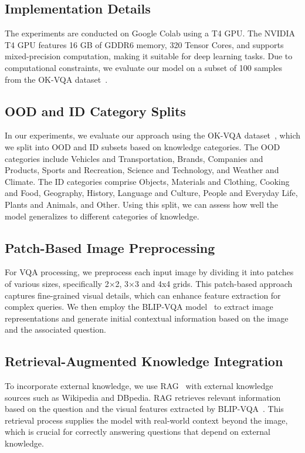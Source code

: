 \subsection{Implementation Details}
The experiments are conducted on Google Colab using a T4 GPU. The NVIDIA T4 GPU features 16 GB of GDDR6 memory, 320 Tensor Cores, and supports mixed-precision computation, making it suitable for deep learning tasks. Due to computational constraints, we evaluate our model on a subset of 100 samples from the OK-VQA dataset~\cite{marino2019ok}.

\subsection{OOD and ID Category Splits}
In our experiments, we evaluate our approach using the OK-VQA dataset~\cite{marino2019ok}, which we split into OOD and ID subsets based on knowledge categories. The OOD categories include Vehicles and Transportation, Brands, Companies and Products, Sports and Recreation, Science and Technology, and Weather and Climate. The ID categories comprise Objects, Materials and Clothing, Cooking and Food, Geography, History, Language and Culture, People and Everyday Life, Plants and Animals, and Other. Using this split, we can assess how well the model generalizes to different categories of knowledge.

\subsection{Patch-Based Image Preprocessing}
For VQA processing, we preprocess each input image by dividing it into patches of various sizes, specifically 2×2, 3×3 and 4x4 grids. This patch-based approach captures fine-grained visual details, which can enhance feature extraction for complex queries. We then employ the BLIP-VQA model~\cite{li2022blip} to extract image representations and generate initial contextual information based on the image and the associated question.

\subsection{Retrieval-Augmented Knowledge Integration}
To incorporate external knowledge, we use  RAG~\cite{lewis2020retrieval} with external knowledge sources such as Wikipedia and DBpedia. RAG retrieves relevant information based on the question and the visual features extracted by BLIP-VQA~\cite{li2022blip}. This retrieval process supplies the model with real-world context beyond the image, which is crucial for correctly answering questions that depend on external knowledge.

